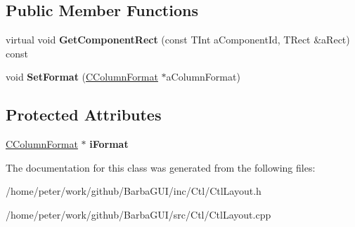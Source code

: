\subsection*{Public Member Functions}
\begin{DoxyCompactItemize}
\item 
\mbox{\label{classCColumnLayout_a1a575b35f5c3a96632fe85dc7d6c0385}} 
virtual void {\bfseries Get\+Component\+Rect} (const T\+Int a\+Component\+Id, T\+Rect \&a\+Rect) const
\item 
\mbox{\label{classCColumnLayout_a285965da00bfee1811a6cc227b4aa83e}} 
void {\bfseries Set\+Format} (\hyperlink{classCColumnFormat}{C\+Column\+Format} $\ast$a\+Column\+Format)
\end{DoxyCompactItemize}
\subsection*{Protected Attributes}
\begin{DoxyCompactItemize}
\item 
\mbox{\label{classCColumnLayout_a132e40e615c3e361b70c6338827574b0}} 
\hyperlink{classCColumnFormat}{C\+Column\+Format} $\ast$ {\bfseries i\+Format}
\end{DoxyCompactItemize}


The documentation for this class was generated from the following files\+:\begin{DoxyCompactItemize}
\item 
/home/peter/work/github/\+Barba\+G\+U\+I/inc/\+Ctl/Ctl\+Layout.\+h\item 
/home/peter/work/github/\+Barba\+G\+U\+I/src/\+Ctl/Ctl\+Layout.\+cpp\end{DoxyCompactItemize}
